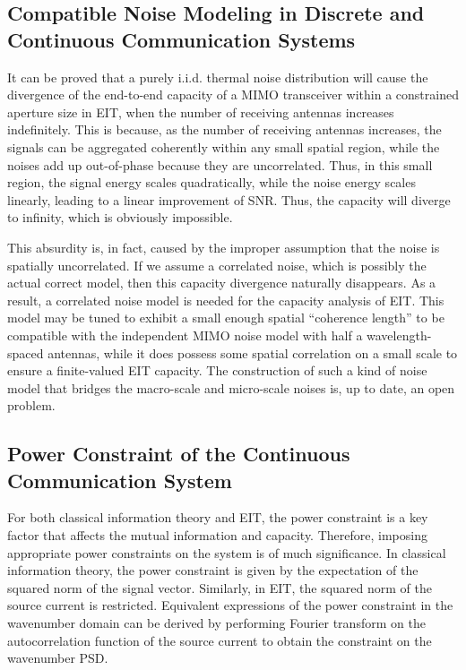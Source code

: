 \documentclass[journal,twocolumn]{IEEEtran}
\begin{document}
\subsection{Compatible Noise Modeling in Discrete and Continuous Communication Systems}
It can be proved that a purely i.i.d. thermal noise distribution will cause the divergence of the end-to-end capacity of a MIMO transceiver within a constrained aperture size in EIT, when the number of receiving antennas increases indefinitely. 
This is because, as the number of receiving antennas increases, the signals can be aggregated coherently within any small spatial region, while the noises add up out-of-phase because they are uncorrelated. 
Thus, in this small region, the signal energy scales quadratically, while the noise energy scales linearly, leading to a linear improvement of SNR. Thus, the capacity will diverge to infinity, which is obviously impossible.  

This absurdity is, in fact, caused by the improper assumption that the noise is spatially uncorrelated. If we assume a correlated noise, which is possibly the actual correct model, then this capacity divergence naturally disappears. 
As a result, a correlated noise model is needed for the capacity analysis of EIT. This model may be tuned to exhibit a small enough spatial ``coherence length'' to be compatible with the independent  MIMO noise model with half a wavelength-spaced antennas, while it does possess some spatial correlation on a small scale to ensure a finite-valued EIT capacity. 
The construction of such a kind of noise model that bridges the macro-scale and micro-scale noises is, up to date, an open problem. 

\subsection{Power Constraint of the Continuous Communication System}
For both classical information theory and EIT, the power constraint is a key factor that affects the mutual information and capacity. Therefore, imposing appropriate power constraints on the system is of much significance. In classical information theory, the power constraint is given by the expectation of the squared norm of the signal vector.  Similarly, in EIT, the squared norm of the source current is restricted. Equivalent expressions of the power constraint in the wavenumber domain can be derived by performing Fourier transform on the autocorrelation function of the source current to obtain the constraint on the wavenumber PSD. 
\end{document}
